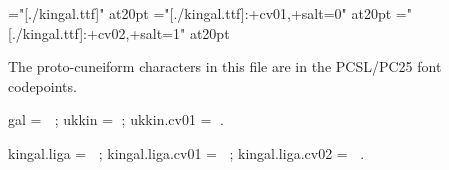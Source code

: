 \font\kingal="[./kingal.ttf]" at20pt
\font\kingali="[./kingal.ttf]:+cv01,+salt=0" at20pt
\font\kingalii="[./kingal.ttf]:+cv02,+salt=1" at20pt

\rm The proto-cuneiform characters in this file are in the PCSL/PC25 font codepoints.

\rm gal = \kingal 𒟛 \rm; ukkin = \kingal 𒪦\rm; ukkin.cv01 = \kingali 𒪦\rm.

\rm kingal.liga = \kingal 𒟛‍𒪦\rm; kingal.liga.cv01 = \kingali 𒟛‍𒪦\rm; kingal.liga.cv02 = \kingalii  𒟛‍𒪦\rm.

\bye
